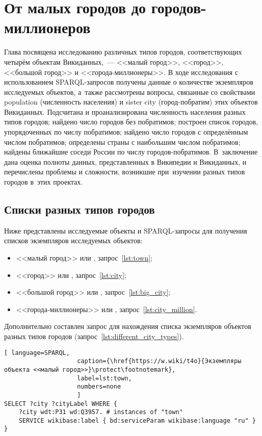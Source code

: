 \chapter{От малых городов до городов-миллионеров}
\label{ch:city}

Глава посвящена исследованию различных типов городов, 
соответствующих четырём объектам Викиданных,~--- 
<<малый город>>, <<город>>, <<большой город>> и <<города-миллионеры>>. 
В ходе исследования с использованием SPARQL-запросов получены данные 
о количестве экземпляров исследуемых объектов, а~также рассмотрены вопросы, 
связанные со свойствами population (численность населения) и sister city (город-побратим) этих объектов Викиданных. 
Подсчитана и проанализирована численность населения разных типов городов; 
найдено число городов без побратимов; построен список городов, упорядоченных по числу побратимов; 
найдено число городов с определённым числом побратимов; 
определены страны с наибольшим числом побратимов; 
найдены ближайшие соседи России по числу городов-побратимов. 
В~заключение дана оценка полноты данных, представленных в Википедии и Викиданных, 
и перечислены проблемы и сложности, возникшие при~изучении разных типов городов в~этих проектах.
\section{Списки разных типов городов}

Ниже представлены исследуемые объекты и SPARQL-запросы для получения списков экземпляров исследуемых объектов: 
\begin{itemize}[leftmargin=24pt]
	\item <<малый город>> или , запрос~\ref{lst:town};
	\item <<город>> или , запрос~\ref{lst:city};
	\item <<большой город>> или , запрос~\ref{lst:big_city};
	\item <<города-миллионеры>> или , запрос~\ref{lst:city_million}.
\end{itemize}

Дополнительно составлен запрос для нахождения списка экземпляров объектов разных типов городов (запрос~\ref{lst:different_city_types}).

\begin{lstlisting}[ language=SPARQL, 
                    caption={\href{https://w.wiki/t4o}{Экземпляры объекта <<малый город>>}\protect\footnotemark},
                    label=lst:town, 
                    numbers=none
                    ]
SELECT ?city ?cityLabel WHERE {
	?city wdt:P31 wd:Q3957. # instances of "town"
	SERVICE wikibase:label { bd:serviceParam wikibase:language "ru" }
}
\end{lstlisting}

